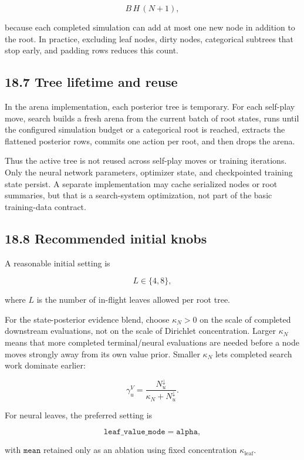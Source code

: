 \documentclass[11pt]{article}
\begin{document}
\[
B\,H\,(N+1),
\]

because each completed simulation can add at most one new node in addition to
the root. In practice, excluding leaf nodes, dirty nodes, categorical subtrees
that stop early, and padding rows reduces this count.

\subsection*{18.7 Tree lifetime and reuse}

In the arena implementation, each posterior tree is temporary. For each
self-play move, search builds a fresh arena from the current batch of root
states, runs until the configured simulation budget or a categorical root is
reached, extracts the flattened posterior rows, commits one action per root, and
then drops the arena.

Thus the active tree is not reused across self-play moves or training
iterations. Only the neural network parameters, optimizer state, and checkpointed
training state persist. A separate implementation may cache serialized nodes or
root summaries, but that is a search-system optimization, not part of the basic
training-data contract.

\subsection*{18.8 Recommended initial knobs}

A reasonable initial setting is

\[
L \in \{4,8\},
\]

where \(L\) is the number of in-flight leaves allowed per root tree.

For the state-posterior evidence blend, choose \(\kappa_N>0\) on the scale of
completed downstream evaluations, not on the scale of Dirichlet concentration.
Larger \(\kappa_N\) means that more completed terminal/neural evaluations are
needed before a node moves strongly away from its own value prior. Smaller
\(\kappa_N\) lets completed search work dominate earlier:

\[
\gamma^V_u=\frac{N^\downarrow_u}{\kappa_N+N^\downarrow_u}.
\]

For neural leaves, the preferred setting is

\[
\texttt{leaf\_value\_mode}=\texttt{alpha},
\]

with \(\texttt{mean}\) retained only as an ablation using fixed concentration
\(\kappa_{\mathrm{leaf}}\).
\end{document}

